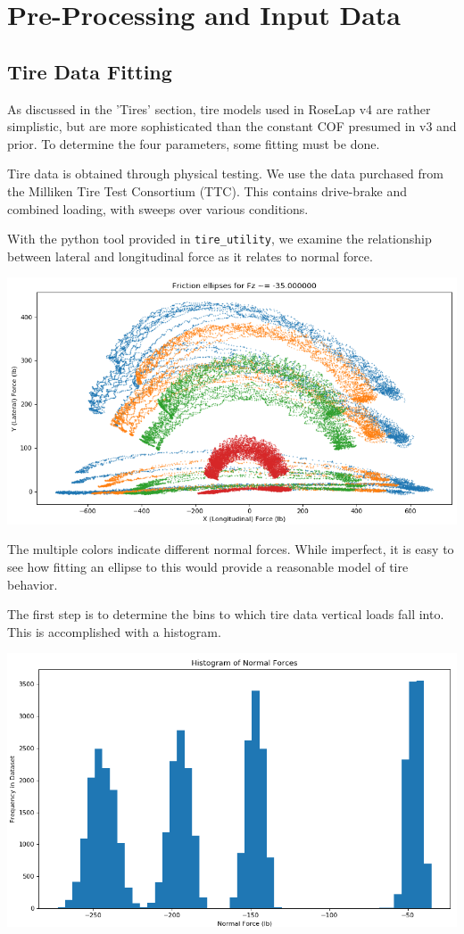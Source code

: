 \documentclass{article}
\begin{document}
\section{Pre-Processing and Input Data}

\subsection{Tire Data Fitting}
As discussed in the 'Tires' section, tire models used in RoseLap v4 are rather simplistic, but are more sophisticated than the constant COF presumed in v3 and prior. To determine the four parameters, some fitting must be done.

Tire data is obtained through physical testing. We use the data purchased from the Milliken Tire Test Consortium (TTC). This contains drive-brake and combined loading, with sweeps over various conditions.

With the python tool provided in \texttt{tire\_utility}, we examine the relationship between lateral and longitudinal force as it relates to normal force.

\includegraphics[width=\textwidth]{fric_ellipses.png}

The multiple colors indicate different normal forces. While imperfect, it is easy to see how fitting an ellipse to this would provide a reasonable model of tire behavior.

The first step is to determine the bins to which tire data vertical loads fall into. This is accomplished with a histogram.

\includegraphics[width=\textwidth]{fric_hist.png}
\end{document}
